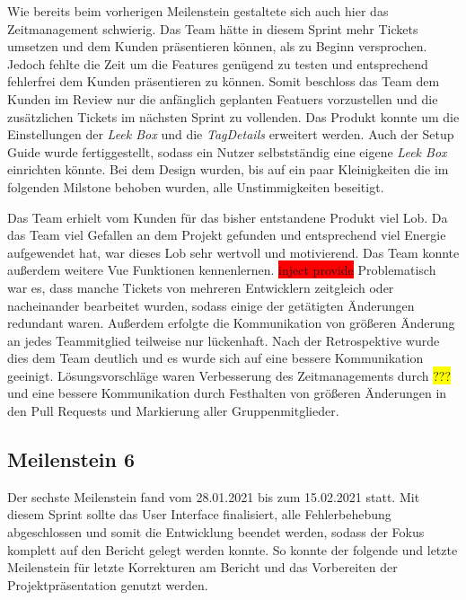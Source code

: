\documentclass[10pt, a4paper]{article}
\begin{document}
\begin{onehalfspace}
Wie bereits beim vorherigen Meilenstein gestaltete sich auch hier das Zeitmanagement schwierig.
Das Team hätte in diesem Sprint mehr Tickets umsetzen und dem Kunden präsentieren können, als zu Beginn versprochen. Jedoch fehlte die Zeit um die Features genügend zu testen und entsprechend fehlerfrei dem Kunden präsentieren zu können.
Somit beschloss das Team dem Kunden im Review nur die anfänglich geplanten Featuers vorzustellen und die zusätzlichen Tickets im nächsten Sprint zu vollenden.
Das Produkt konnte um die Einstellungen der \textit{Leek Box} und die \textit{TagDetails}  erweitert werden.
Auch der Setup Guide wurde fertiggestellt, sodass ein Nutzer selbstständig eine eigene \textit{Leek Box} einrichten könnte.
Bei dem Design wurden, bis auf ein paar Kleinigkeiten die im folgenden Milstone behoben wurden, alle Unstimmigkeiten beseitigt.

Das Team erhielt vom Kunden für das bisher entstandene Produkt viel Lob.
Da das Team viel Gefallen an dem Projekt gefunden und entsprechend viel Energie aufgewendet hat, war dieses Lob sehr wertvoll und motivierend.
Das Team konnte außerdem weitere Vue Funktionen kennenlernen.
\colorbox{red}{inject provide}
Problematisch war es, dass manche Tickets von mehreren Entwicklern zeitgleich oder nacheinander bearbeitet wurden, sodass einige der getätigten Änderungen redundant waren.
Außerdem erfolgte die Kommunikation von größeren Änderung an jedes Teammitglied teilweise nur lückenhaft.
Nach der Retrospektive wurde dies dem Team deutlich und es wurde sich auf eine bessere Kommunikation geeinigt.
Lösungsvorschläge waren Verbesserung des Zeitmanagements durch \colorbox{yellow}{???} und eine bessere Kommunikation durch Festhalten von größeren Änderungen in den Pull Requests und Markierung aller Gruppenmitglieder.

\subsection{Meilenstein 6}
Der sechste Meilenstein fand vom 28.01.2021 bis zum 15.02.2021 statt.
Mit diesem Sprint sollte das User Interface finalisiert, alle Fehlerbehebung abgeschlossen und somit die Entwicklung beendet werden, sodass der Fokus komplett auf den Bericht gelegt werden konnte.
So konnte der folgende und letzte Meilenstein für letzte Korrekturen am Bericht und das Vorbereiten der Projektpräsentation genutzt werden.
\\~\\

\end{onehalfspace}
\end{document}
